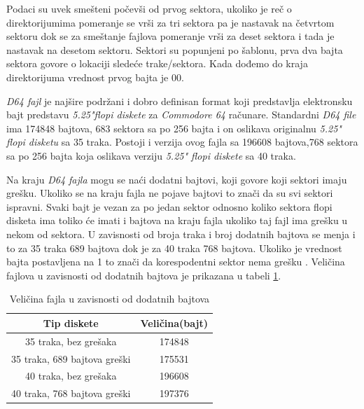 Podaci su uvek smešteni počevši od prvog sektora, ukoliko je reč o direktorijumima pomeranje se vrši za tri sektora pa je nastavak na četvrtom sektoru dok se za smeštanje fajlova pomeranje vrši za deset sektora i tada je nastavak na desetom sektoru. Sektori su popunjeni po šablonu, prva dva bajta sektora govore o lokaciji sledeće trake/sektora. Kada dođemo do kraja direktorijuma vrednost prvog bajta je 00.

\textit{D64 fajl} je najšire podržani i dobro definisan format koji predstavlja elektronsku bajt predstavu \textit{5.25"flopi diskete} za \textit{Commodore 64} računare. Standardni \textit{D64 file} ima 174848 bajtova, 683 sektora sa po 256 bajta i on oslikava originalnu \textit{5.25" flopi disketu} sa 35 traka.  Postoji i verzija ovog fajla sa 196608 bajtova,768 sektora sa po 256 bajta koja oslikava verziju \textit{5.25" flopi diskete} sa 40 traka.

Na kraju \textit{D64 fajla} mogu se naći dodatni bajtovi, koji govore koji sektori imaju grešku. Ukoliko se na kraju fajla ne pojave bajtovi to znači da su svi sektori ispravni. Svaki bajt je vezan za po jedan sektor odnosno koliko sektora flopi disketa ima toliko će imati i bajtova na kraju fajla ukoliko taj fajl ima grešku u nekom od sektora. U zavisnosti od broja traka i broj dodatnih bajtova se menja i to za 35 traka 689 bajtova dok je za 40 traka 768 bajtova. Ukoliko je vrednost bajta postavljena na 1 to znači da korespodentni sektor nema grešku \cite{D64}. Veličina fajlova u zavisnosti od dodatnih bajtova je prikazana u tabeli \ref{tab:error_velicina}.
\begin{table}[h!]
\begin{center}
\begin{tabular}{ | c | c |} 
\hline
Tip diskete & Veličina(bajt) \\
\hline
\hline
35 traka, bez grešaka & 174848 \\
\hline
35 traka, 689 bajtova greški & 175531 \\
\hline
40 traka, bez grešaka & 196608 \\
\hline
40 traka, 768 bajtova greški & 197376 \\
\hline
\end{tabular}
\end{center}
\caption{Veličina fajla u zavisnosti od dodatnih bajtova}
\label{tab:error_velicina}
\end{table}
